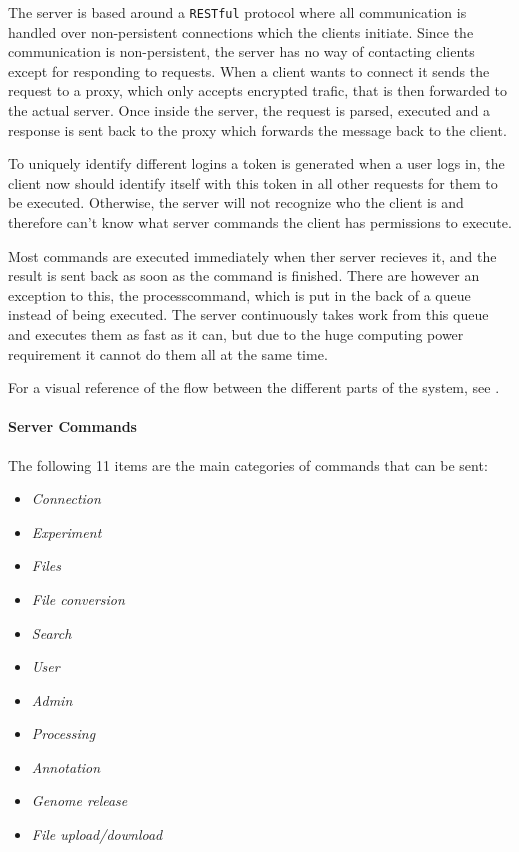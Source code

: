 
\label{chap:com_systemdesign}
The server is based around a \texttt{RESTful} protocol where all communication is handled over non-persistent connections which the clients initiate. Since the communication is non-persistent, the server has no way of contacting clients except for responding to requests. When a client wants to connect it sends the request to a proxy, which only accepts encrypted trafic, that is then forwarded to the actual server. Once inside the server, the request is parsed, executed and a response is sent back to the proxy which forwards the message back to the client. 

To uniquely identify different logins a token is generated when a user logs in, the client now should identify itself with this token in all other requests for them to be executed. Otherwise, the server will not recognize who the client
is and therefore can't know what server commands the client has permissions to execute. 

Most commands are executed immediately when ther server recieves it, and the result is sent back as soon as the command is finished. There are however an exception to this, the processcommand, which is put in the back of a queue instead of being executed. The server continuously takes work from this queue and executes them as fast as it can, but due to the huge computing power requirement it cannot do them all at the same time. 

For a visual reference of the flow between the different parts of the system, see .

\paragraph*{Server Commands}

The following 11 items are the main categories of commands that can be sent: 

\begin{itemize}
	\item \textit{Connection}
	\item \textit{Experiment}
	\item \textit{Files}
	\item \textit{File conversion}
	\item \textit{Search}
	\item \textit{User}
	\item \textit{Admin}
	\item \textit{Processing}
	\item \textit{Annotation}
	\item \textit{Genome release}
	\item \textit{File upload/download}
\end{itemize}

